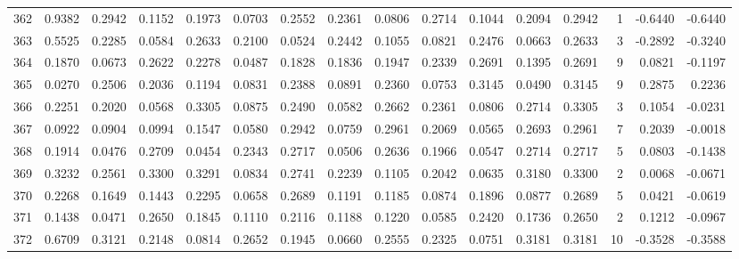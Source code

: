 \begin{tabular}{lrrrrrrrrrrrrrrr}
362 &      0.9382 &  0.2942 &  0.1152 &  0.1973 &  0.0703 &  0.2552 &  0.2361 &  0.0806 &  0.2714 &  0.1044 &   0.2094 &     0.2942 &      1 &                   -0.6440 &                    -0.6440 \\
363 &      0.5525 &  0.2285 &  0.0584 &  0.2633 &  0.2100 &  0.0524 &  0.2442 &  0.1055 &  0.0821 &  0.2476 &   0.0663 &     0.2633 &      3 &                   -0.2892 &                    -0.3240 \\
364 &      0.1870 &  0.0673 &  0.2622 &  0.2278 &  0.0487 &  0.1828 &  0.1836 &  0.1947 &  0.2339 &  0.2691 &   0.1395 &     0.2691 &      9 &                    0.0821 &                    -0.1197 \\
365 &      0.0270 &  0.2506 &  0.2036 &  0.1194 &  0.0831 &  0.2388 &  0.0891 &  0.2360 &  0.0753 &  0.3145 &   0.0490 &     0.3145 &      9 &                    0.2875 &                     0.2236 \\
366 &      0.2251 &  0.2020 &  0.0568 &  0.3305 &  0.0875 &  0.2490 &  0.0582 &  0.2662 &  0.2361 &  0.0806 &   0.2714 &     0.3305 &      3 &                    0.1054 &                    -0.0231 \\
367 &      0.0922 &  0.0904 &  0.0994 &  0.1547 &  0.0580 &  0.2942 &  0.0759 &  0.2961 &  0.2069 &  0.0565 &   0.2693 &     0.2961 &      7 &                    0.2039 &                    -0.0018 \\
368 &      0.1914 &  0.0476 &  0.2709 &  0.0454 &  0.2343 &  0.2717 &  0.0506 &  0.2636 &  0.1966 &  0.0547 &   0.2714 &     0.2717 &      5 &                    0.0803 &                    -0.1438 \\
369 &      0.3232 &  0.2561 &  0.3300 &  0.3291 &  0.0834 &  0.2741 &  0.2239 &  0.1105 &  0.2042 &  0.0635 &   0.3180 &     0.3300 &      2 &                    0.0068 &                    -0.0671 \\
370 &      0.2268 &  0.1649 &  0.1443 &  0.2295 &  0.0658 &  0.2689 &  0.1191 &  0.1185 &  0.0874 &  0.1896 &   0.0877 &     0.2689 &      5 &                    0.0421 &                    -0.0619 \\
371 &      0.1438 &  0.0471 &  0.2650 &  0.1845 &  0.1110 &  0.2116 &  0.1188 &  0.1220 &  0.0585 &  0.2420 &   0.1736 &     0.2650 &      2 &                    0.1212 &                    -0.0967 \\
372 &      0.6709 &  0.3121 &  0.2148 &  0.0814 &  0.2652 &  0.1945 &  0.0660 &  0.2555 &  0.2325 &  0.0751 &   0.3181 &     0.3181 &     10 &                   -0.3528 &                    -0.3588 \\

\end{tabular}
